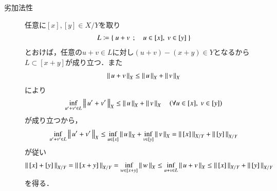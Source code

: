 \begin{prf}
\begin{description}
			\item[劣加法性]
				任意に$[x],[y] \in X/Y$を取り
				\begin{align}
					L \coloneqq \left\{\ u + v\ \, ; \quad u \in [x],\ v \in [y]\ \right\}
				\end{align}
				とおけば，任意の$u+v \in L$に対し$(u+v) - (x+y) \in Y$となるから$L \subset [x+y]$が成り立つ．また
				\begin{align}
					\left\|\, u + v\, \right\|_{X} \leq \left\|\, u\, \right\|_{X} + \left\|\, v\, \right\|_{X}
				\end{align}
				により
				\begin{align}
					\operatorname*{inf}_{u'+v' \in L} \left\|\, u' + v'\, \right\|_{X} \leq \left\|\, u\, \right\|_{X} + \left\|\, v\, \right\|_{X} \quad (\forall u \in [x],\ v \in [y])
				\end{align}
				が成り立つから，
				\begin{align}
					\operatorname*{inf}_{u'+v' \in L} \left\|\, u' + v'\, \right\|_{X} 
					\leq \operatorname*{inf}_{u \in [x]} \left\|\, u\, \right\|_{X} + \operatorname*{inf}_{v \in [y]} \left\|\, v\, \right\|_{X}
					= \left\|\, [x]\, \right\|_{X/Y} + \left\|\, [y]\, \right\|_{X/Y}
				\end{align}
				が従い
				\begin{align}
					\left\|\, [x] + [y]\, \right\|_{X/Y} = \left\|\, [x+y]\, \right\|_{X/Y} 
					= \operatorname*{inf}_{w \in [x+y]} \left\|\, w\, \right\|_{X} 
					\leq \operatorname*{inf}_{u+v \in L} \left\|\, u + v\, \right\|_{X}
					\leq \left\|\, [x]\, \right\|_{X/Y} + \left\|\, [y]\, \right\|_{X/Y}
				\end{align}
				を得る．
		\end{description}
		\QED
	\end{prf}